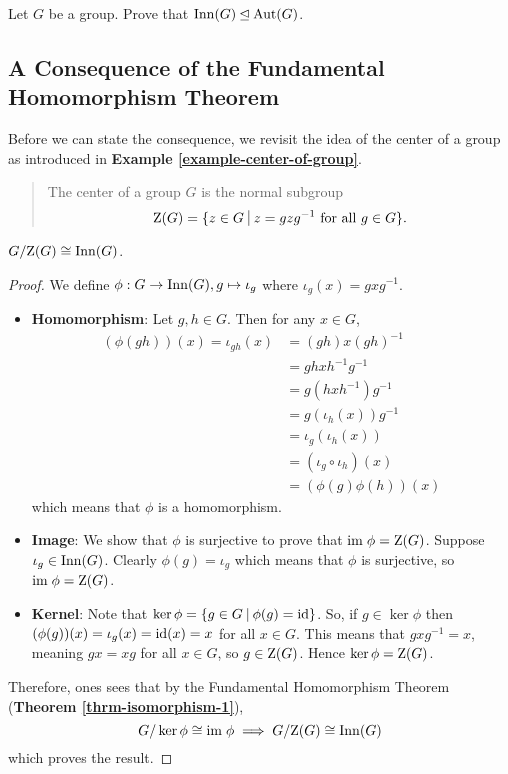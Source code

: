 \begin{exercise}
    Let $G$ be a group. Prove that $\mathrm{Inn}(G) \unlhd \mathrm{Aut}(G)$.
\end{exercise}

\subsection{A Consequence of the Fundamental Homomorphism Theorem}
Before we can state the consequence, we revisit the idea of the center of a group as introduced in \textbf{Example \ref{example-center-of-group}}.
\begin{quote}
    The center of a group $G$ is the normal subgroup
    \[
        \Z{G} = \{z \in G \vert z = gzg^{-1} \text{ for all } g \in G\}.
    \]
\end{quote}

\begin{proposition}
    $G/\mathrm{Z}(G) \cong \mathrm{Inn}(G)$.
\end{proposition}
\begin{proof}
    We define $\phi: G \to \mathrm{Inn}(G), g \mapsto \iota_g$ where $\iota_g(x) = gxg^{-1}$.
    \begin{itemize}
        \item \textbf{Homomorphism}: Let $g, h \in G$. Then for any $x \in G$,
        \begin{align*}
            (\phi(gh))(x) = \iota_{gh}(x) &= (gh)x(gh)^{-1}\\
            &= ghxh^{-1}g^{-1}\\
            &= g(hxh^{-1})g^{-1}\\
            &= g(\iota_h(x))g^{-1}\\
            &=\iota_g(\iota_h(x))\\
            &=(\iota_g\circ\iota_h)(x)\\
            &=(\phi(g)\phi(h))(x)
        \end{align*}
        which means that $\phi$ is a homomorphism.

        \item \textbf{Image}: We show that $\phi$ is surjective to prove that $\mathrm{im}\; \phi = \mathrm{Z}(G)$. Suppose $\iota_g \in \mathrm{Inn}(G)$. Clearly $\phi(g) = \iota_g$  which means that $\phi$ is surjective, so $\mathrm{im}\;\phi = \mathrm{Z}(G)$.

        \item \textbf{Kernel}: Note that $\ker\phi = \{g \in G \vert \phi(g) = \id\}$. So, if $g \in \ker\phi$ then $(\phi(g))(x) = \iota_g(x) = \mathrm{id}(x) = x$ for all $x \in G$. This means that $gxg^{-1} = x$, meaning $gx = xg$ for all $x \in G$, so $g \in \mathrm{Z}(G)$. Hence $\ker\phi = \mathrm{Z}(G)$.
    \end{itemize}
    Therefore, ones sees that by the Fundamental Homomorphism Theorem (\textbf{Theorem \ref{thrm-isomorphism-1}}),
    \[
        G/\ker\phi \cong \mathrm{im}\;\phi \implies G/\mathrm{Z}(G) \cong \mathrm{Inn}(G)
    \]
    which proves the result.
\end{proof}

